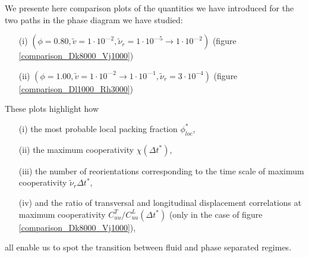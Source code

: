 \documentclass[class=report, float=false, crop=false]{standalone}
\begin{document}
We presente here comparison plots of the quantities we have introduced for the two paths in the phase diagram we have studied:
\begin{enumerate}
  \item[(i)] $(\phi = 0.80, \tilde{v} = 1\cdot10^{—2}, \tilde{\nu}_r = 1\cdot10^{—5} \rightarrow 1\cdot10^{—2})$ (figure \ref{comparison_Dk8000_Vj1000})
  \item[(ii)] $(\phi = 1.00, \tilde{v} = 1\cdot10^{—2} \rightarrow 1\cdot10^{—1}, \tilde{\nu}_r = 3\cdot10^{-4})$ (figure \ref{comparison_Dl1000_Rh3000})\\
\end{enumerate}

These plots highlight how
\begin{enumerate}
  \item[(i)] the most probable local packing fraction $\phi_{loc}^*$,
  \item[(ii)] the maximum cooperativity $\chi(\Delta t^*)$,
  \item[(iii)] the number of reorientations corresponding to the time scale of maximum cooperativity $\tilde{\nu}_r\Delta t^*$,
  \item[(iv)] and the ratio of transversal and longitudinal displacement correlations at maximum cooperativity $C_{uu}^T/C_{uu}^L(\Delta t^*)$ (only in the case of figure \ref{comparison_Dk8000_Vj1000}),
\end{enumerate}
all enable us to spot the transition between fluid and phase separated regimes.

\newpage
\end{document}
